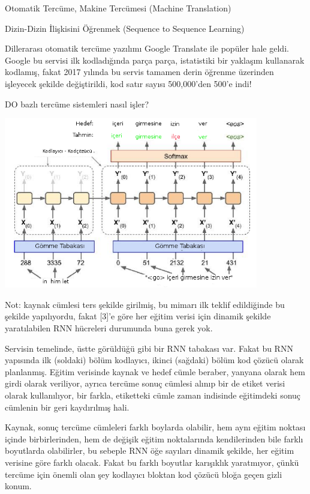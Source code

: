 \documentclass[12pt,fleqn]{article}\usepackage{../../common}
\begin{document}
Otomatik Tercüme, Makine Tercümesi (Machine Translation)

Dizin-Dizin İlişkisini Öğrenmek (Sequence to Sequence Learning)

Dillerarası otomatik tercüme yazılımı Google Translate ile popüler hale
geldi. Google bu servisi ilk kodladığında parça parça, istatistiki bir
yaklaşım kullanarak kodlamış, fakat 2017 yılında bu servis tamamen derin
öğrenme üzerinden işleyecek şekilde değiştirildi, kod satır sayısı
500,000'den 500'e indi!

DO bazlı tercüme sistemleri nasıl işler? 

\includegraphics[width=30em]{seq_02.png}

Not: kaynak cümlesi ters şekilde girilmiş, bu mimarı ilk teklif edildiğinde
bu şekilde yapılıyordu, fakat [3]'e göre her eğitim verisi için dinamik
şekilde yaratılabilen RNN hücreleri durumunda buna gerek yok.

Servisin temelinde, üstte görüldüğü gibi bir RNN tabakası var. Fakat bu RNN
yapısında ilk (soldaki) bölüm kodlayıcı, ikinci (sağdaki) bölüm kod çözücü
olarak planlanmış.  Eğitim verisinde kaynak ve hedef cümle beraber, yanyana
olarak hem girdi olarak veriliyor, ayrıca tercüme sonuç cümlesi alınıp bir
de etiket verisi olarak kullanılıyor, bir farkla, etiketteki cümle zaman
indisinde eğitimdeki sonuç cümlenin bir geri kaydırılmış hali.

Kaynak, sonuç tercüme cümleleri farklı boylarda olabilir, hem aynı eğitim
noktası içinde birbirlerinden, hem de değişik eğitim noktalarında
kendilerinden bile farklı boyutlarda olabilirler, bu sebeple RNN öğe
sayıları dinamik şekilde, her eğitim verisine göre farklı olacak. Fakat bu
farklı boyutlar karışıklık yaratmıyor, çünkü tercüme için önemli olan şey
kodlayıcı bloktan kod çözücü bloğa geçen gizli konum.
\end{document}
